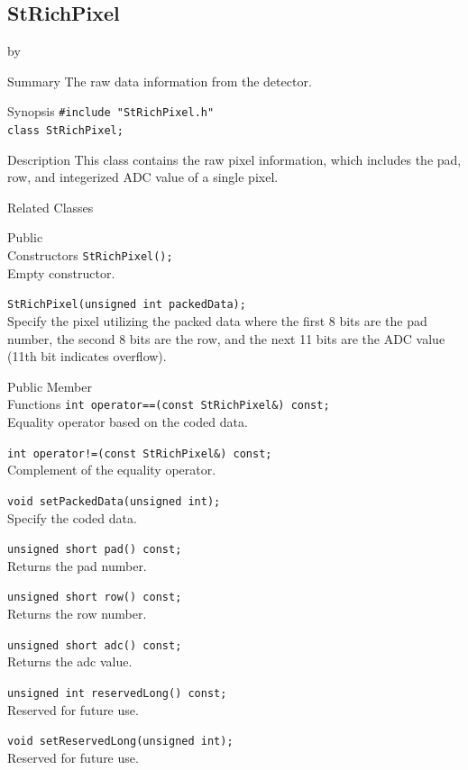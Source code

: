 \documentclass[twoside]{article}
\newcommand{\entrylabel}[1]{\mbox{\textbf{{#1}}}\hfil}%
\newenvironment{entry}
{\begin{list}{}%
    {\renewcommand{\makelabel}{\entrylabel}%
     \setlength{\labelwidth}{90pt}%
     \setlength{\leftmargin}{\labelwidth}
     \advance\leftmargin by \labelsep%
      }%
    }%
  {\end{list}}
\newcommand{\Entrylabel}[1]%
{\raisebox{0pt}[1ex][0pt]{\makebox[\labelwidth][l]%
    {\parbox[t]{\labelwidth}{\hspace{0pt}\textbf{{#1}}}}}}
\newenvironment{Entry}%
{\renewcommand{\entrylabel}{\Entrylabel}\begin{entry}}%
  {\end{entry}}
\begin{document}
\subsection{StRichPixel}
\label{sec:StRichPixel}
\begin{Entry}
\item[Summary] The raw data information from the detector.
\item[Synopsis]
    \verb+#include "StRichPixel.h"+\\
    \verb+class StRichPixel;+\\
\item[Description] This class contains the raw pixel
    information, which includes the pad, row, and integerized
    ADC value of a single pixel.
\item[Related Classes]
\item[Public\\ Constructors]
    \verb+StRichPixel();+\\
    Empty constructor.

    \verb+StRichPixel(unsigned int packedData);+\\
    Specify the pixel utilizing the packed data where
    the first 8 bits are the pad
    number, the second 8 bits are the row, and the next 11 bits
    are the ADC value (11th bit indicates overflow).
\item[Public Member\\ Functions]
    \verb+int operator==(const StRichPixel&) const;+\\
    Equality operator based on the coded data.

    \verb+int operator!=(const StRichPixel&) const;+\\
    Complement of the equality operator.

    \verb+void setPackedData(unsigned int);+\\
    Specify the coded data.

    \verb+unsigned short pad() const;+\\
    Returns the pad number.

    \verb+unsigned short row() const;+\\
    Returns the row number.

    \verb+unsigned short adc() const;+\\
    Returns the adc value.

    \verb+unsigned int reservedLong() const;+\\
    Reserved for future use.

    \verb+void setReservedLong(unsigned int);+\\
    Reserved for future use.
\end{Entry}
\clearpage
\end{document}
